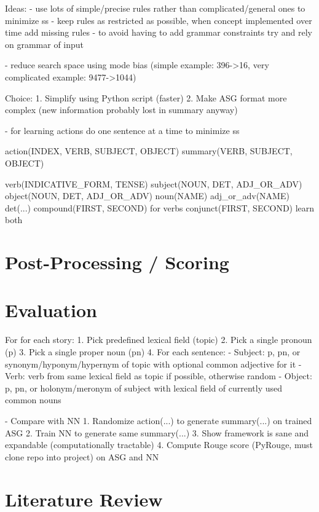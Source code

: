 \documentclass[12pt,twoside]{report}
\theoremstyle{definition}
\begin{document}
Ideas:
- use lots of simple/precise rules rather than complicated/general ones to minimize ss
- keep rules as restricted as possible, when concept implemented over time add missing rules
- to avoid having to add grammar constraints try and rely on grammar of input

- reduce search space using mode bias (simple example: 396->16, very complicated example: 9477->1044)

Choice:
1. Simplify using Python script (faster)
2. Make ASG format more complex (new information probably lost in summary anyway)

- for learning actions do one sentence at a time to minimize ss

action(INDEX, VERB, SUBJECT, OBJECT)
summary(VERB, SUBJECT, OBJECT)

verb(INDICATIVE\_FORM, TENSE)
subject(NOUN, DET, ADJ\_OR\_ADV)
object(NOUN, DET, ADJ\_OR\_ADV)
noun(NAME)
adj\_or\_adv(NAME)
det(...)
compound(FIRST, SECOND)  for verbs
conjunct(FIRST, SECOND)  learn both

\chapter{Post-Processing / Scoring}


\chapter{Evaluation}


For for each story:
1. Pick predefined lexical field (topic)
2. Pick a single pronoun (p)
3. Pick a single proper noun (pn)
4. For each sentence:
    - Subject: p, pn, or synonym/hyponym/hypernym of topic with optional common adjective for it
    - Verb: verb from same lexical field as topic if possible, otherwise random
    - Object: p, pn, or holonym/meronym of subject with lexical field of currently used common nouns
    

- Compare with NN
    1. Randomize action(...) to generate summary(...) on trained ASG
    2. Train NN to generate same summary(...)
    3. Show framework is sane and expandable (computationally tractable)
    4. Compute Rouge score (PyRouge, must clone repo into project) on ASG and NN

\chapter{Literature Review}


\begin{appendices}


\end{appendices}



\pagestyle{PageNum}
\end{document}
